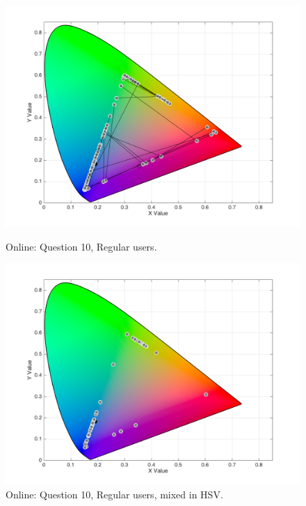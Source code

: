 \begin{figure}[htbp]
  \centering
  \vspace{-15pt}
  \begin{minipage}{0.48\textwidth}
    \centering
    \includegraphics[width=\textwidth]{images/results/10_online_regularUsers.png}
    \caption[Online: Answers for Question 10, from regular users.]{Online: Question 10, Regular users.}
    \label{fig:onlineregular_10}
  \end{minipage}\hfill
  \begin{minipage}{0.48\textwidth}
    \centering
    \includegraphics[width=\textwidth]{images/results/10_online_HSVresponses.png}
    \caption[Online: Answers for Question 10, from regular users, mixed in HSV Color Model.]{Online: Question 10, Regular users, mixed in HSV.}
    \label{fig:onlinehsvregular_10}
  \end{minipage}
  \vspace{-5pt}
\end{figure}
%
